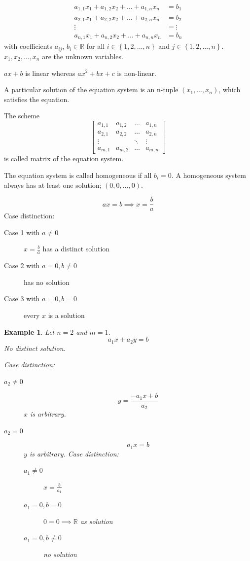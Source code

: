 \documentclass[a4paper,landscape,twocolumn]{article}
\newcommand\set[1]{\left\{#1\right\}}
\newtheorem{ex}{Example}
\begin{document}
\begin{align*}
  a_{1,1} x_1 + a_{1,2} x_2 + \ldots + a_{1,n} x_n &= b_1 \\
  a_{2,1} x_1 + a_{2,2} x_2 + \ldots + a_{2,n} x_n &= b_2 \\
    \vdots                                     &= \vdots \\
  a_{n,1} x_1 + a_{n,2} x_2 + \ldots + a_{n,n} x_n &= b_n
\end{align*}
with coefficients $a_{ij}$, $b_i \in \mathbb{R}$ for all $i \in \set{1,2,\ldots,n}$ and $j \in \set{1,2,\ldots,n}$.
$x_1,x_2,\ldots,x_n$ are the unknown variables.

$ax+b$ is linear whereas $ax^2 + bx + c$ is non-linear.

A particular solution of the equation system is an n-tuple $(x_1, \ldots, x_n)$,
which satisfies the equation.

The scheme
\begin{displaymath}
  \begin{bmatrix}
    a_{1,1} & a_{1,2} & \ldots & a_{1,n} \\
    a_{2,1} & a_{2,2} & \ldots & a_{2,n} \\
    \vdots &        & \ddots & \vdots \\
    a_{m,1} & a_{m,2} & \ldots & a_{m,n}
  \end{bmatrix}
\end{displaymath}
is called matrix of the equation system.

The equation system is called homogeneous if all $b_i = 0$.
A homogeneous system always has at least one solution; $(0, 0, \ldots, 0)$.

\[ ax = b \implies x = \frac ba \]
Case distinction:
\begin{description}
  \item[Case 1 with $a \neq 0$]
    $x = \frac ba$ has a distinct solution
  \item[Case 2 with $a = 0, b \neq 0$]
    has no solution
  \item[Case 3 with $a = 0, b = 0$]
    every $x$ is a solution
\end{description}

\begin{ex}
Let $n = 2$ and $m=1$.
\[ a_1 x + a_2 y = b \]
No distinct solution.

Case distinction:
\begin{description}
  \item[$a_2 \neq 0$]
    \[ y = \frac{-a_1 x + b}{a_2} \]
    $x$ is arbitrary.
  \item[$a_2 = 0$]
    \[ a_1 x = b \]
    $y$ is arbitrary. Case distinction:
    \begin{description}
      \item[$a_1 \neq 0$] $x = \frac{b}{a_1}$
      \item[$a_1 = 0, b = 0$] $0 = 0 \implies \mathbb{R}$ as solution
      \item[$a_1 = 0, b \neq 0$] no solution
    \end{description}
\end{description}
\end{ex}
\end{document}
